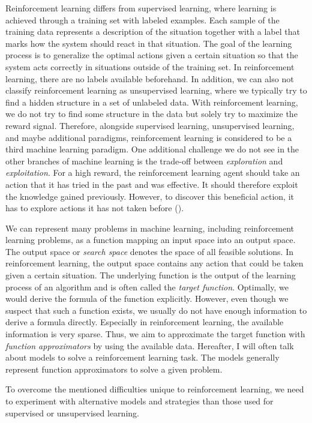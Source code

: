 Reinforcement learning differs from supervised learning, where learning is achieved through a training set with labeled examples. Each sample of the training data represents a description of the situation together with a label that marks how the system should react in that situation. The goal of the learning process is to generalize the optimal actions given a certain situation so that the system acts correctly in situations outside of the training set. In reinforcement learning, there are no labels available beforehand. In addition, we can also not classify reinforcement learning as unsupervised learning, where we typically try to find a hidden structure in a set of unlabeled data. With reinforcement learning, we do not try to find some structure in the data but solely try to maximize the reward signal. Therefore, alongside supervised learning, unsupervised learning, and maybe additional paradigms, reinforcement learning is considered to be a third machine learning paradigm. One additional challenge we do not see in the other branches of machine learning is the trade-off between \textit{exploration} and \textit{exploitation}. For a high reward, the reinforcement learning agent should take an action that it has tried in the past and was effective. It should therefore exploit the knowledge gained previously. However, to discover this beneficial action, it has to explore actions it has not taken before (\cite{sutton2018reinforcement}).

We can represent many problems in machine learning, including reinforcement learning problems, as a function mapping an input space into an output space. The output space or \textit{search space} denotes the space of all feasible solutions. In reinforcement learning, the output space contains any action that could be taken given a certain situation. The underlying function is the output of the learning process of an algorithm and is often called the \textit{target function}. Optimally, we would derive the formula of the function explicitly. However, even though we suspect that such a function exists, we usually do not have enough information to derive a formula directly. Especially in reinforcement learning, the available information is very sparse. Thus, we aim to approximate the target function with \textit{function approximators} by using the available data. Hereafter, I will often talk about models to solve a reinforcement learning task. The models generally represent function approximators to solve a given problem.

To overcome the mentioned difficulties unique to reinforcement learning, we need to experiment with alternative models and strategies than those used for supervised or unsupervised learning.

